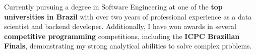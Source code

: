 \documentclass[a4paper,12pt]{article}
\begin{document}

Currently pursuing a degree in Software Engineering at one of the \textbf{top universities in Brazil}
with over two years of professional experience as a data scientist and backend developer.
Additionally, I have won awards in several \textbf{competitive programming} competitions, including the \textbf{ICPC Brazilian Finals}, demonstrating my strong
analytical abilities to solve complex problems.
\end{document}
